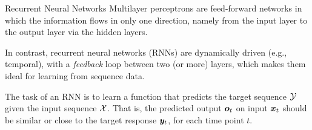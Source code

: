\begin{frame}{Recurrent Neural Networks}
%
%
Multilayer perceptrons are feed-forward networks in which the
information flows in only one direction, namely from the input layer to
the output layer via the hidden layers. 

	\medskip

In contrast, recurrent neural
networks (RNNs) are dynamically driven (e.g., temporal), with a {\em
feedback} loop between two (or more) layers, which makes them %
ideal for learning from  sequence data. %
%
%
%

\medskip

The task of an RNN is to learn a
function that predicts the target sequence ${\mathcal Y}$ given the input sequence
${\mathcal X}$. That is, the predicted output ${\boldsymbol o}_t$ on input ${\boldsymbol x}_t$ should be
similar or close to the target response ${\boldsymbol y}_t$, for each time point $t$.

\end{frame}

